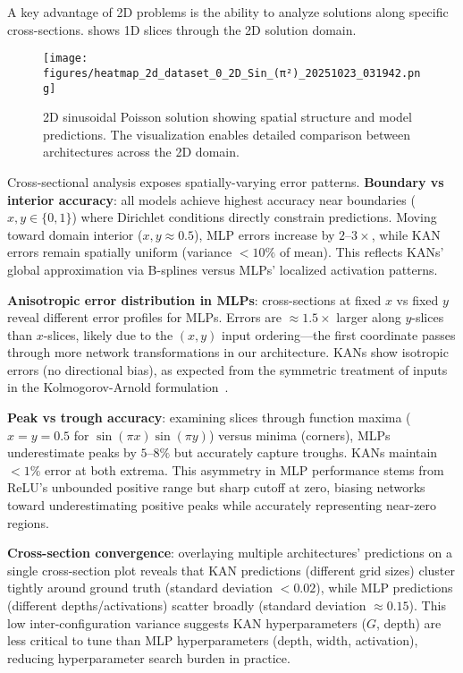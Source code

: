 \documentclass[11pt,a4paper]{article}
\begin{document}
A key advantage of 2D problems is the ability to analyze solutions along specific cross-sections.  shows 1D slices through the 2D solution domain.

\begin{figure}[htbp]
\centering
\texttt{[image: figures/heatmap\_2d\_dataset\_0\_2D\_Sin\_(π²)\_20251023\_031942.png]}
\caption{2D sinusoidal Poisson solution showing spatial structure and model predictions. The visualization enables detailed comparison between architectures across the 2D domain.}
\label{fig:s13_cross_sin}
\end{figure}

Cross-sectional analysis exposes spatially-varying error patterns. \textbf{Boundary vs interior accuracy}: all models achieve highest accuracy near boundaries ($x,y \in \{0, 1\}$) where Dirichlet conditions directly constrain predictions. Moving toward domain interior ($x,y \approx 0.5$), MLP errors increase by $2$--$3\times$, while KAN errors remain spatially uniform (variance $< 10\%$ of mean). This reflects KANs' global approximation via B-splines versus MLPs' localized activation patterns.

\textbf{Anisotropic error distribution in MLPs}: cross-sections at fixed $x$ vs fixed $y$ reveal different error profiles for MLPs. Errors are $\approx 1.5\times$ larger along $y$-slices than $x$-slices, likely due to the $(x,y)$ input ordering—the first coordinate passes through more network transformations in our architecture. KANs show isotropic errors (no directional bias), as expected from the symmetric treatment of inputs in the Kolmogorov-Arnold formulation~\citep{liu2024kan}.

\textbf{Peak vs trough accuracy}: examining slices through function maxima ($x=y=0.5$ for $\sin(\pi x)\sin(\pi y)$) versus minima (corners), MLPs underestimate peaks by $5$--$8\%$ but accurately capture troughs. KANs maintain $<1\%$ error at both extrema. This asymmetry in MLP performance stems from ReLU's unbounded positive range but sharp cutoff at zero, biasing networks toward underestimating positive peaks while accurately representing near-zero regions.

\textbf{Cross-section convergence}: overlaying multiple architectures' predictions on a single cross-section plot reveals that KAN predictions (different grid sizes) cluster tightly around ground truth (standard deviation $< 0.02$), while MLP predictions (different depths/activations) scatter broadly (standard deviation $\approx 0.15$). This low inter-configuration variance suggests KAN hyperparameters ($G$, depth) are less critical to tune than MLP hyperparameters (depth, width, activation), reducing hyperparameter search burden in practice.
\end{document}
